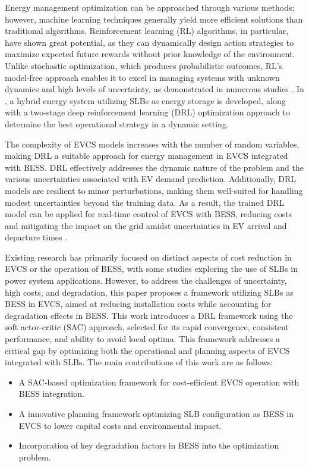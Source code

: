 \documentclass[10pt, journal]{IEEEtran}
\begin{document}
Energy management optimization can be approached through various methods; however, machine learning techniques generally yield more efficient solutions than traditional algorithms. Reinforcement learning (RL) algorithms, in particular, have shown great potential, as they can dynamically design action strategies to maximize expected future rewards without prior knowledge of the environment. Unlike stochastic optimization, which produces probabilistic outcomes, RL’s model-free approach enables it to excel in managing systems with unknown dynamics and high levels of uncertainty, as demonstrated in numerous studies  \cite{lee2021dynamic}. In \cite{hu2024deep}, a hybrid energy system utilizing SLBs as energy storage is developed, along with a two-stage deep reinforcement learning (DRL) optimization approach to determine the best operational strategy in a dynamic setting. 
\vspace{-1mm}

The complexity of EVCS models increases with the number of random variables, making DRL a suitable approach for energy management in EVCS integrated with BESS. DRL effectively addresses the dynamic nature of the problem and the various uncertainties associated with EV demand prediction. Additionally, DRL models are resilient to minor perturbations, making them well-suited for handling modest uncertainties beyond the training data. As a result, the trained DRL model can be applied for real-time control of EVCS with BESS, reducing costs and mitigating the impact on the grid amidst uncertainties in EV arrival and departure times \cite{hussain2022deep, bui2019double}.
\vspace{-1mm}

Existing research has primarily focused on distinct aspects of cost reduction in EVCS or the operation of BESS, with some studies exploring the use of SLBs in power system applications. However, to address the challenges of uncertainty, high costs, and degradation, this paper proposes a framework utilizing SLBs as BESS in EVCS, aimed at reducing installation costs while accounting for degradation effects in BESS. This work introduces a DRL framework using the soft actor-critic (SAC) approach, selected for its rapid convergence, consistent performance, and ability to avoid local optima. This framework addresses a critical gap by optimizing both the operational and planning aspects of EVCS integrated with SLBs. The main contributions of this work are as follows:

\vspace{-2mm}
\begin{itemize}[leftmargin=3mm]
\item A SAC-based optimization framework for cost-efficient EVCS operation with BESS integration.
\item A innovative planning framework optimizing SLB configuration as BESS in EVCS to lower capital costs and environmental impact.
\item Incorporation of key degradation factors in BESS into the optimization problem.
\end{itemize}
\end{document}
